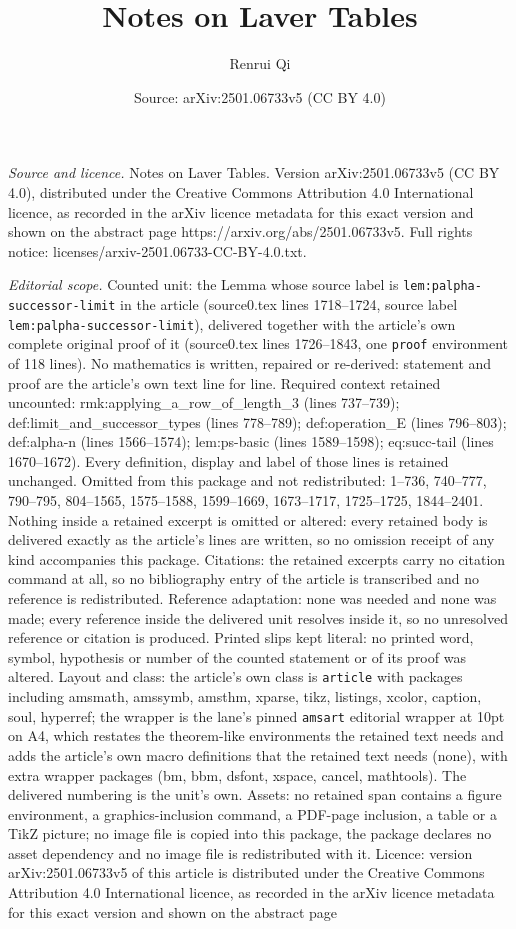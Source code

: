 \documentclass[10pt,a4paper]{amsart}
\title[Notes on Laver Tables]{Notes on Laver Tables}
\author{Renrui Qi}
\date{Source: arXiv:2501.06733v5 (CC BY 4.0)}
\begin{document}
\maketitle

\noindent\emph{Source and licence.} Notes on Laver Tables. Version arXiv:2501.06733v5 (CC BY 4.0), distributed under the Creative Commons Attribution 4.0 International licence, as recorded in the arXiv licence metadata for this exact version and shown on the abstract page https://arxiv.org/abs/2501.06733v5. Full rights notice: licenses/arxiv-2501.06733-CC-BY-4.0.txt.\par\smallskip

\noindent\textit{Editorial scope.} Counted unit: the Lemma whose source label is \texttt{lem:palpha-successor-limit} in the article (source0.tex lines 1718--1724, source label \texttt{lem:palpha-successor-limit}), delivered together with the article's own complete original proof of it (source0.tex lines 1726--1843, one \texttt{proof} environment of 118 lines). No mathematics is written, repaired or re-derived: statement and proof are the article's own text line for line. Required context retained uncounted: rmk:applying\_a\_row\_of\_length\_3 (lines 737--739); def:limit\_and\_successor\_types (lines 778--789); def:operation\_E (lines 796--803); def:alpha-n (lines 1566--1574); lem:ps-basic (lines 1589--1598); eq:succ-tail (lines 1670--1672). Every definition, display and label of those lines is retained unchanged. Omitted from this package and not redistributed: 1--736, 740--777, 790--795, 804--1565, 1575--1588, 1599--1669, 1673--1717, 1725--1725, 1844--2401. Nothing inside a retained excerpt is omitted or altered: every retained body is delivered exactly as the article's lines are written, so no omission receipt of any kind accompanies this package. Citations: the retained excerpts carry no citation command at all, so no bibliography entry of the article is transcribed and no reference is redistributed. Reference adaptation: none was needed and none was made; every reference inside the delivered unit resolves inside it, so no unresolved reference or citation is produced. Printed slips kept literal: no printed word, symbol, hypothesis or number of the counted statement or of its proof was altered. Layout and class: the article's own class is \texttt{article} with packages including amsmath, amssymb, amsthm, xparse, tikz, listings, xcolor, caption, soul, hyperref; the wrapper is the lane's pinned \texttt{amsart} editorial wrapper at 10pt on A4, which restates the theorem-like environments the retained text needs and adds the article's own macro definitions that the retained text needs (none), with extra wrapper packages (bm, bbm, dsfont, xspace, cancel, mathtools). The delivered numbering is the unit's own. Assets: no retained span contains a figure environment, a graphics-inclusion command, a PDF-page inclusion, a table or a TikZ picture; no image file is copied into this package, the package declares no asset dependency and no image file is redistributed with it. Licence: version arXiv:2501.06733v5 of this article is distributed under the Creative Commons Attribution 4.0 International licence, as recorded in the arXiv licence metadata for this exact version and shown on the abstract page 
\end{document}
